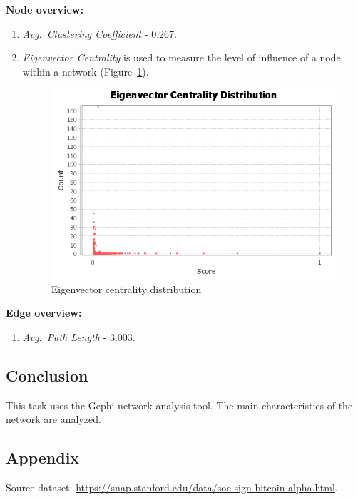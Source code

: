 \textbf{Node overview:}
\begin{enumerate}
    \item \textit{Avg.\ Clustering Coefficient} - 0.267.
    \item \textit{Eigenvector Centrality} is used to measure the level of influence of a node within a network (Figure~\ref{ris:eigenvector}).
        \begin{figure}[H]
        \center
        \includegraphics[width=\textwidth]{img/eigenvector.png}
        \caption{Eigenvector centrality distribution}
        \label{ris:eigenvector}
        \end{figure}
\end{enumerate}

\textbf{Edge overview:}
\begin{enumerate}
    \item \textit{Avg.\ Path Length} - 3.003.
\end{enumerate}

\subsection{Conclusion}\label{subsec:conclusion}

This task uses the Gephi network analysis tool.
The main characteristics of the network are analyzed.

\subsection{Appendix}\label{subsec:appendix}

Source dataset: \url{https://snap.stanford.edu/data/soc-sign-bitcoin-alpha.html}.
